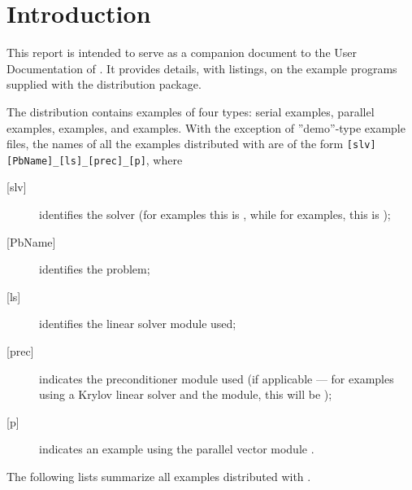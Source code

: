 \section{Introduction}\label{s:ex_intro}

This report is intended to serve as a companion document to the User
Documentation of {\ida} \cite{ida_ug}.  It provides details, with
listings, on the example programs supplied with the {\ida} distribution
package.

The {\ida} distribution contains examples of four types: serial
{\CC} examples, parallel {\CC} examples, {\F} examples, and
{\petsc} examples. 
With the exception of ''demo''-type example files, the names of all the examples 
distributed with {\sundials} are of the form \verb![slv][PbName]_[ls]_[prec]_[p]!, 
where
\begin{description}
\item [{[slv]}] identifies the solver (for {\ida} examples this is , 
  while for {\fida} examples, this is );
\item [{[PbName]}] identifies the problem;
\item [{[ls]}] identifies the linear solver module used;
\item [{[prec]}] indicates the {\ida} preconditioner module used
  (if applicable --- for examples using a Krylov linear solver
  and the {\idabbdpre} module, this will be );
\item [{[p]}] indicates an example using the parallel vector module {\nvecp}.
\end{description}

\vspace{0.2in}\noindent
The following lists summarize all examples distributed with {\ida}.

